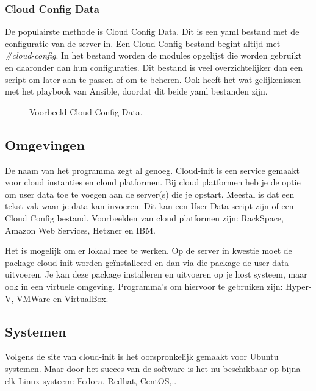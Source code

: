\subsubsection{Cloud Config Data}
De populairste methode is Cloud Config Data. Dit is een yaml bestand met de configuratie van de server in. Een Cloud Config bestand begint altijd met \textit{\#cloud-config}. In het bestand worden de modules opgelijst die worden gebruikt en daaronder dan hun configuraties. Dit bestand is veel overzichtelijker dan een script om later aan te passen of om te beheren. Ook heeft het wat gelijkenissen met het playbook van Ansible, doordat dit beide yaml bestanden zijn.
\begin{figure}[!htb]
	\caption{Voorbeeld Cloud Config Data.}
	\label{fig:cloudconfig}
\end{figure}

\newpage
\subsection{Omgevingen}
De naam van het programma zegt al genoeg. Cloud-init is een service gemaakt voor cloud instanties en cloud platformen. Bij cloud platformen heb je de optie om user data toe te voegen aan de server(s) die je opstart. Meestal is dat een tekst vak waar je data kan invoeren. Dit kan een User-Data script zijn of een Cloud Config bestand. Voorbeelden van cloud platformen zijn: RackSpace, Amazon Web Services, Hetzner en IBM. 

Het is mogelijk om er lokaal mee te werken. Op de server in kwestie moet de package cloud-init worden geïnstalleerd en dan via die package de user data uitvoeren. Je kan deze package installeren en uitvoeren op je host systeem, maar ook in een virtuele omgeving. Programma's om hiervoor te gebruiken zijn: Hyper-V, VMWare en VirtualBox.

\subsection{Systemen}
Volgens de site van cloud-init \autocite{cloudsite} is het oorspronkelijk gemaakt voor Ubuntu systemen. Maar door het succes van de software is het nu beschikbaar op bijna elk Linux systeem: Fedora, Redhat, CentOS,..


